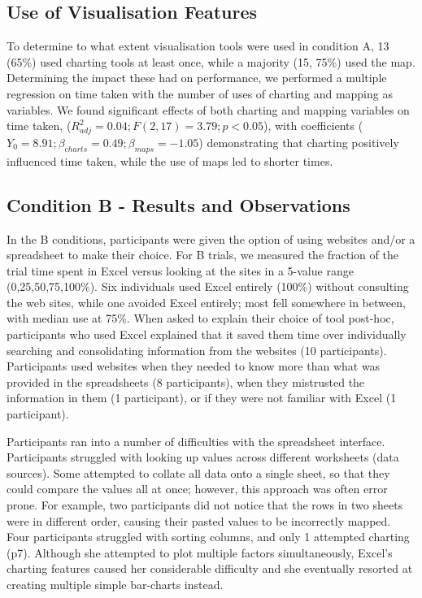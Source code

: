 \documentclass{sigchi}
\begin{document}
\subsection{Use of Visualisation Features}
To determine to what extent visualisation tools were used in condition A, 13 (65\%) used charting tools at least once, while a majority (15, 75\%) used the map.  Determining the impact these had on performance, we performed a multiple regression on time taken with the number of uses of charting and mapping as variables.   We found significant effects of both charting and mapping variables on time taken, ($R^2_{adj} = 0.04; F(2,17)=3.79; p<0.05$), with coefficients ($Y_0=8.91;\beta_{charts}=0.49;\beta_{maps}=-1.05$) demonstrating that charting positively influenced time taken, while the use of maps led to shorter times.

\subsection{Condition B - Results and Observations}
In the B conditions, participants were given the option of using websites and/or a spreadsheet to make their choice.  For B trials, we measured the fraction of the trial time spent in Excel versus looking at the sites in a 5-value range (0,25,50,75,100\%).  Six individuals used Excel entirely (100\%) without consulting the web sites, while one avoided Excel entirely; most fell somewhere in between, with median use at 75\%.   When asked to explain their choice of tool post-hoc, participants who used Excel explained that it saved them time over individually searching and consolidating information from the websites (10 participants).  Participants used websites when they needed to know more than what was provided in the spreadsheets (8 participants), when they mistrusted the information in them (1 participant), or if they were not familiar with Excel (1 participant).

Participants ran into a number of difficulties with the spreadsheet interface. Participants struggled with looking up values across different worksheets (data sources).  Some attempted to collate all data onto a single sheet, so that they could compare the values all at once; however, this approach was often error prone.  For example, two participants did not notice that the rows in two sheets were in different order, causing their pasted values to be incorrectly mapped.  Four participants struggled with sorting columns, and only 1 attempted charting (p7).  Although she attempted to plot multiple factors simultaneously, Excel's charting features caused her considerable difficulty and she eventually resorted at creating multiple simple bar-charts instead.
\end{document}
